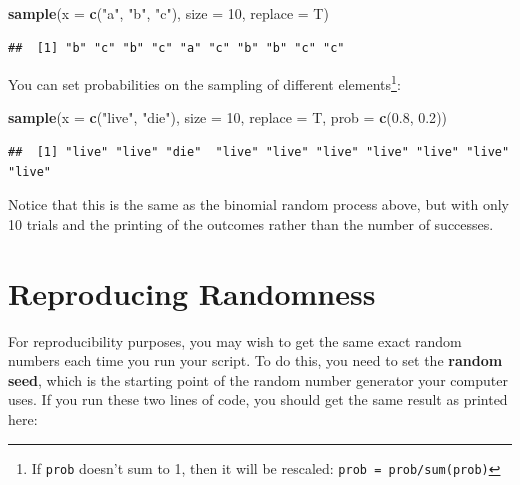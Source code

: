 \documentclass[]{book}
\newenvironment{Shaded}{\begin{snugshade}}{\end{snugshade}}
\newcommand{\KeywordTok}[1]{\textcolor[rgb]{0.13,0.29,0.53}{\textbf{#1}}}
\newcommand{\DataTypeTok}[1]{\textcolor[rgb]{0.13,0.29,0.53}{#1}}
\newcommand{\DecValTok}[1]{\textcolor[rgb]{0.00,0.00,0.81}{#1}}
\newcommand{\FloatTok}[1]{\textcolor[rgb]{0.00,0.00,0.81}{#1}}
\newcommand{\StringTok}[1]{\textcolor[rgb]{0.31,0.60,0.02}{#1}}
\newcommand{\NormalTok}[1]{#1}
\let\rmarkdownfootnote\footnote%
\def\footnote{\protect\rmarkdownfootnote}
\theoremstyle{definition}
\theoremstyle{definition}
\theoremstyle{definition}
\theoremstyle{remark}
\begin{document}
\begin{Shaded}
\begin{Highlighting}[]
\KeywordTok{sample}\NormalTok{(}\DataTypeTok{x =} \KeywordTok{c}\NormalTok{(}\StringTok{"a"}\NormalTok{, }\StringTok{"b"}\NormalTok{, }\StringTok{"c"}\NormalTok{), }\DataTypeTok{size =} \DecValTok{10}\NormalTok{, }\DataTypeTok{replace =}\NormalTok{ T)}
\end{Highlighting}
\end{Shaded}

\begin{verbatim}
##  [1] "b" "c" "b" "c" "a" "c" "b" "b" "c" "c"
\end{verbatim}

You can set probabilities on the sampling of different
elements\footnote{If \texttt{prob} doesn't sum to 1, then it will be
  rescaled: \texttt{prob\ =\ prob/sum(prob)}}:

\begin{Shaded}
\begin{Highlighting}[]
\KeywordTok{sample}\NormalTok{(}\DataTypeTok{x =} \KeywordTok{c}\NormalTok{(}\StringTok{"live"}\NormalTok{, }\StringTok{"die"}\NormalTok{), }\DataTypeTok{size =} \DecValTok{10}\NormalTok{, }\DataTypeTok{replace =}\NormalTok{ T,}
       \DataTypeTok{prob =} \KeywordTok{c}\NormalTok{(}\FloatTok{0.8}\NormalTok{, }\FloatTok{0.2}\NormalTok{))}
\end{Highlighting}
\end{Shaded}

\begin{verbatim}
##  [1] "live" "live" "die"  "live" "live" "live" "live" "live" "live" "live"
\end{verbatim}

Notice that this is the same as the binomial random process above, but
with only 10 trials and the printing of the outcomes rather than the
number of successes.

\section{Reproducing Randomness}\label{reproducing-randomness}

For reproducibility purposes, you may wish to get the same exact random
numbers each time you run your script. To do this, you need to set the
\textbf{random seed}, which is the starting point of the random number
generator your computer uses. If you run these two lines of code, you
should get the same result as printed here:
\end{document}
